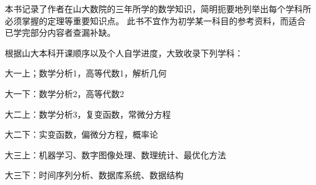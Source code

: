  \vspace*{0.0cm}
\thispagestyle{empty}
\vspace*{2.2cm}
\centerline{\hei{\color{darkblue}{内~容~简~介}}}\vspace{2cm}

本书记录了作者在山大数院的三年所学的数学知识，简明扼要地列举出每个学科所必须掌握的定理等重要知识点。
此书不宜作为初学某一科目的参考资料，而适合已学完部分内容者查漏补缺。

根据山大本科开课顺序以及个人自学进度，大致收录下列学科：

大一上；数学分析1，高等代数1，解析几何

大一下：数学分析2，高等代数2

大二上：数学分析3，复变函数，常微分方程

大二下：实变函数，偏微分方程，概率论

大三上：机器学习、数字图像处理、数理统计、最优化方法

大三下：时间序列分析、数据库系统、数据结构

